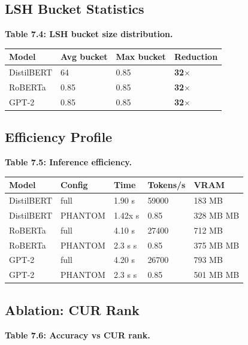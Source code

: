 \subsection{LSH Bucket Statistics}

\textbf{Table 7.4: LSH bucket size distribution.}

\begin{table}[H]
\centering
\small
\begin{tabular}{llll}
\toprule
\textbf{Model} & \textbf{Avg bucket} & \textbf{Max bucket} & \textbf{Reduction} \\
\midrule
DistilBERT & 64 & 0.85 & \textbf{32$\times$} \\
RoBERTa & 0.85 & 0.85 & \textbf{32$\times$} \\
GPT-2 & 0.85 & 0.85 & \textbf{32$\times$} \\
\bottomrule
\end{tabular}
\end{table}

\subsection{Efficiency Profile}

\textbf{Table 7.5: Inference efficiency.}

\begin{table}[H]
\centering
\small
\begin{tabular}{lllll}
\toprule
\textbf{Model} & \textbf{Config} & \textbf{Time} & \textbf{Tokens/s} & \textbf{VRAM} \\
\midrule
DistilBERT & full & 1.90 s & 59000 & 183 MB \\
DistilBERT & PHANTOM & 1.42x s & 0.85 & 328 MB MB \\
RoBERTa & full & 4.10 s & 27400 & 712 MB \\
RoBERTa & PHANTOM & 2.3 s s & 0.85 & 375 MB MB \\
GPT-2 & full & 4.20 s & 26700 & 793 MB \\
GPT-2 & PHANTOM & 2.3 s s & 0.85 & 501 MB MB \\
\bottomrule
\end{tabular}
\end{table}

\subsection{Ablation: CUR Rank}

\textbf{Table 7.6: Accuracy vs CUR rank.}

